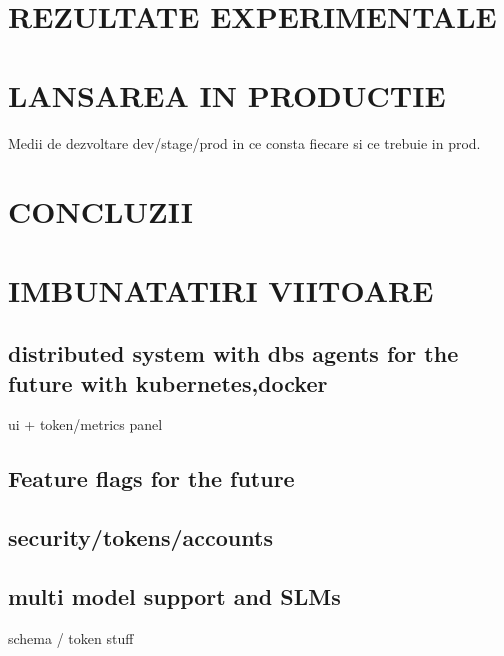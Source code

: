 \documentclass[12pt, a4paper, oneside, romanian, draft]{teza-upb}
\begin{document}

\chapter{REZULTATE EXPERIMENTALE}

\chapter{LANSAREA IN PRODUCTIE}
Medii de dezvoltare dev/stage/prod in ce consta fiecare si ce trebuie in prod.

\chapter{CONCLUZII}



\chapter{IMBUNATATIRI VIITOARE}

  \section{distributed system with dbs agents for the future with kubernetes,docker}
  ui + token/metrics panel
  \section{Feature flags for the future}
  \section{security/tokens/accounts}
  \section{multi model support and SLMs}
  schema / token stuff






\end{document}
